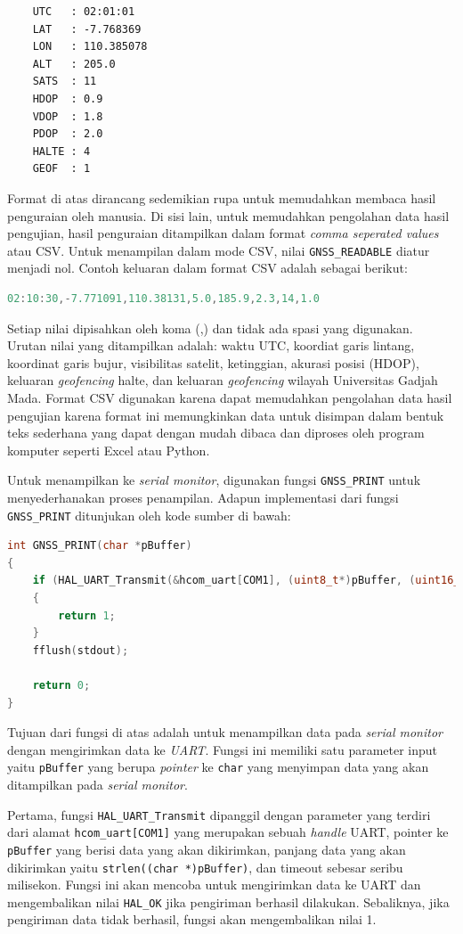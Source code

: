 \begin{lstlisting}
	UTC   : 02:01:01
	LAT   : -7.768369
	LON   : 110.385078
	ALT   : 205.0
	SATS  : 11
	HDOP  : 0.9
	VDOP  : 1.8
	PDOP  : 2.0
	HALTE : 4
	GEOF  : 1
\end{lstlisting}

Format di atas dirancang sedemikian rupa untuk memudahkan membaca hasil penguraian oleh manusia. Di sisi lain, untuk memudahkan pengolahan data hasil pengujian, hasil penguraian ditampilkan dalam format \textit{comma seperated values} atau CSV. Untuk menampilan dalam mode CSV, nilai \texttt{GNSS\_READABLE} diatur menjadi nol. Contoh keluaran dalam format CSV adalah sebagai berikut:

\begin{lstlisting}[language=c]
02:10:30,-7.771091,110.38131,5.0,185.9,2.3,14,1.0
\end{lstlisting}

Setiap nilai dipisahkan oleh koma (,) dan tidak ada spasi yang digunakan. Urutan nilai yang ditampilkan adalah: waktu UTC, koordiat garis lintang, koordinat garis bujur, visibilitas satelit, ketinggian, akurasi posisi (HDOP), keluaran \textit{geofencing} halte, dan keluaran \textit{geofencing} wilayah Universitas Gadjah Mada. Format CSV digunakan karena dapat memudahkan pengolahan data hasil pengujian karena format ini memungkinkan data untuk disimpan dalam bentuk teks sederhana yang dapat dengan mudah dibaca dan diproses oleh program komputer seperti Excel atau Python.

Untuk menampilkan ke \textit{serial monitor}, digunakan fungsi \texttt{GNSS\_PRINT} untuk menyederhanakan proses penampilan. Adapun implementasi dari fungsi \texttt{GNSS\_PRINT} ditunjukan oleh kode sumber di bawah:

\begin{lstlisting}[language=c]
int GNSS_PRINT(char *pBuffer)
{
	if (HAL_UART_Transmit(&hcom_uart[COM1], (uint8_t*)pBuffer, (uint16_t)strlen((char *)pBuffer), 1000) != HAL_OK)
	{
		return 1;
	}
	fflush(stdout);
	
	return 0;
}
\end{lstlisting}

Tujuan dari fungsi di atas adalah untuk menampilkan data pada \textit{serial monitor} dengan mengirimkan data ke \textit{UART}. Fungsi ini memiliki satu parameter input yaitu \texttt{pBuffer} yang berupa \textit{pointer} ke \texttt{char} yang menyimpan data yang akan ditampilkan pada \textit{serial monitor}.

Pertama, fungsi \texttt{HAL\_UART\_Transmit} dipanggil dengan parameter yang terdiri dari alamat \texttt{hcom\_uart[COM1]} yang merupakan sebuah \textit{handle} UART, pointer ke \texttt{pBuffer} yang berisi data yang akan dikirimkan, panjang data yang akan dikirimkan yaitu \texttt{strlen((char *)pBuffer)}, dan timeout sebesar seribu milisekon. Fungsi ini akan mencoba untuk mengirimkan data ke UART dan mengembalikan nilai \texttt{HAL\_OK} jika pengiriman berhasil dilakukan. Sebaliknya, jika pengiriman data tidak berhasil, fungsi akan mengembalikan nilai 1.

